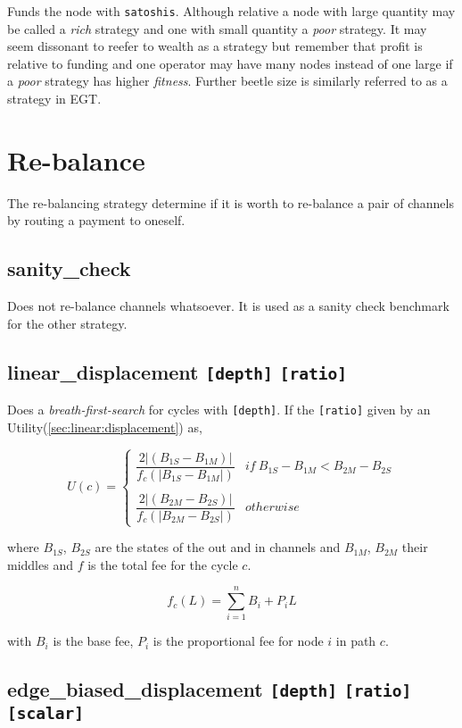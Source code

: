 Funds the node with \texttt{satoshis}. Although relative a node with large quantity may be called a \textit{rich} strategy and
one with small quantity a \textit{poor} strategy. It may seem dissonant to reefer to wealth as a strategy but remember 
that profit is relative to funding and one operator may have many nodes instead of one large if a \textit{poor} strategy
has higher \textit{fitness}. Further beetle size is similarly referred to as a strategy in EGT.

\section*{Re-balance}

The re-balancing strategy determine if it is worth to re-balance a pair of channels by routing a payment to oneself.

\subsection*{sanity\_check}

Does not re-balance channels whatsoever. It is used as a sanity check benchmark for the other strategy.

\subsection*{linear\_displacement \texttt{[depth]} \texttt{[ratio]}}

Does a \textit{breath-first-search} for cycles with \texttt{[depth]}. If the \texttt{[ratio]} given by an Utility(\ref{sec:linear:displacement}) as,

\[ U(c) = \begin{cases} 
\dfrac{2|(B_{1S} - B_{1M})|}{f_c(|B_{1S} - B_{1M}|)}  & if~B_{1S} - B_{1M} < B_{2M} - B_{2S} \\ 
\\
\dfrac{2|(B_{2M} - B_{2S})|}{f_c(|B_{2M} - B_{2S}|)}  & otherwise
\end{cases} \]

where $B_{1S}$, $B_{2S}$ are the states of the out and in channels and $B_{1M}$, $B_{2M}$ their middles and $f$ is the total fee for the cycle $c$. 

\[f_c(L) = \sum_{i=1}^{n} B_i + P_iL \]

with $B_i$ is the base fee, $P_i$ is the proportional fee for node $i$ in path $c$.

\subsection*{edge\_biased\_displacement \texttt{[depth]} \texttt{[ratio]} \texttt{[scalar]}}

